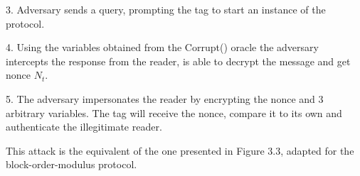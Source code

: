     3. Adversary sends a query, prompting the tag to start an instance of the protocol.

    4. Using the variables obtained from the Corrupt() oracle the adversary intercepts the response from the reader, is able to decrypt 
    the message and get nonce $N_t$. 

    5. The adversary impersonates the reader by encrypting the nonce and 3 arbitrary variables. The tag will receive the nonce, compare it
    to its own and authenticate the illegitimate reader.

    This attack is the equivalent of the one presented in Figure 3.3, adapted for the block-order-modulus protocol. 

    \begin{adjustwidth}{-17pt}{}
\end{adjustwidth}
